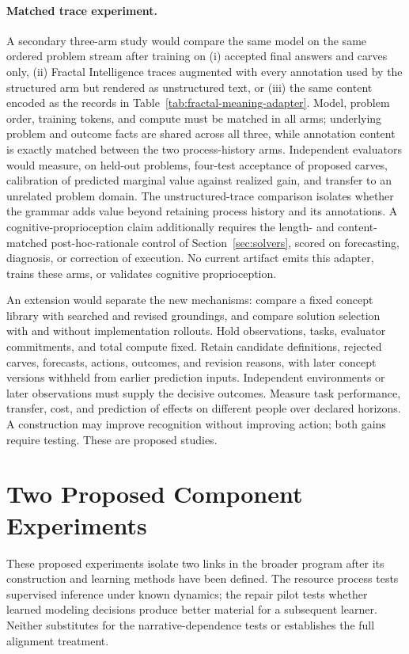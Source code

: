 \documentclass[10pt]{article}
\begin{document}
\paragraph{Matched trace experiment.}
A secondary three-arm study would compare the same model on the same ordered
problem stream after training on (i) accepted final answers and carves only,
(ii) Fractal Intelligence traces augmented with every annotation used by the
structured arm but rendered as unstructured text, or (iii) the same content
encoded as the records in Table~\ref{tab:fractal-meaning-adapter}. Model,
problem order, training tokens, and compute must be matched in all arms;
underlying problem and outcome facts are shared across all three, while
annotation content is exactly matched between the two process-history arms.
Independent evaluators would measure, on held-out problems, four-test acceptance
of proposed carves, calibration of predicted marginal value against realized
gain, and transfer to an unrelated problem domain. The unstructured-trace
comparison isolates whether the grammar adds value beyond retaining process
history and its annotations. A cognitive-proprioception claim additionally
requires the length- and content-matched post-hoc-rationale control of
Section~\ref{sec:solvers}, scored on forecasting, diagnosis, or correction of
execution. No current artifact emits this adapter, trains these arms, or
validates cognitive proprioception.

An extension would separate the new mechanisms: compare a fixed concept
library with searched and revised groundings, and compare solution selection
with and without implementation rollouts. Hold observations, tasks, evaluator
commitments, and total compute fixed. Retain candidate definitions, rejected
carves, forecasts, actions, outcomes, and revision reasons, with later concept
versions withheld from earlier prediction inputs. Independent environments or
later observations must supply the decisive outcomes. Measure task performance,
transfer, cost, and prediction of effects on different people over declared
horizons. A construction may improve recognition without improving action;
both gains require testing. These are proposed studies.

\section{Two Proposed Component Experiments}
\label{sec:component-experiments}

These proposed experiments isolate two links in the broader program after
its construction and learning methods have been defined. The resource process
tests supervised inference under known dynamics; the repair pilot tests whether
learned modeling decisions produce better material for a subsequent learner.
Neither substitutes for the narrative-dependence tests or establishes the
full alignment treatment.
\end{document}
